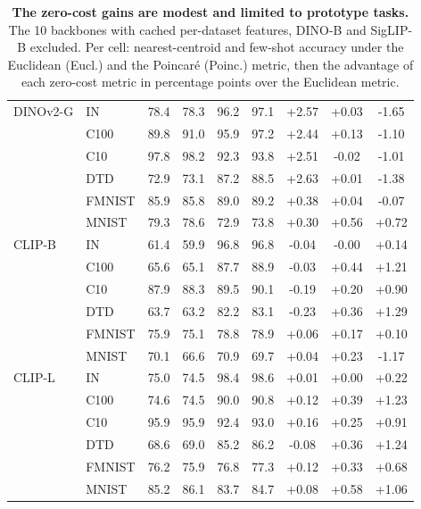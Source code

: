 \begin{table}[H]
\begin{tabular}{llccccccc}
\midrule
DINOv2-G & IN & 78.4 & 78.3 & 96.2 & 97.1 & +2.57 & +0.03 & -1.65 \\
 & C100 & 89.8 & 91.0 & 95.9 & 97.2 & +2.44 & +0.13 & -1.10 \\
 & C10 & 97.8 & 98.2 & 92.3 & 93.8 & +2.51 & -0.02 & -1.01 \\
 & DTD & 72.9 & 73.1 & 87.2 & 88.5 & +2.63 & +0.01 & -1.38 \\
 & FMNIST & 85.9 & 85.8 & 89.0 & 89.2 & +0.38 & +0.04 & -0.07 \\
 & MNIST & 79.3 & 78.6 & 72.9 & 73.8 & +0.30 & +0.56 & +0.72 \\
\midrule
CLIP-B & IN & 61.4 & 59.9 & 96.8 & 96.8 & -0.04 & -0.00 & +0.14 \\
 & C100 & 65.6 & 65.1 & 87.7 & 88.9 & -0.03 & +0.44 & +1.21 \\
 & C10 & 87.9 & 88.3 & 89.5 & 90.1 & -0.19 & +0.20 & +0.90 \\
 & DTD & 63.7 & 63.2 & 82.2 & 83.1 & -0.23 & +0.36 & +1.29 \\
 & FMNIST & 75.9 & 75.1 & 78.8 & 78.9 & +0.06 & +0.17 & +0.10 \\
 & MNIST & 70.1 & 66.6 & 70.9 & 69.7 & +0.04 & +0.23 & -1.17 \\
\midrule
CLIP-L & IN & 75.0 & 74.5 & 98.4 & 98.6 & +0.01 & +0.00 & +0.22 \\
 & C100 & 74.6 & 74.5 & 90.0 & 90.8 & +0.12 & +0.39 & +1.23 \\
 & C10 & 95.9 & 95.9 & 92.4 & 93.0 & +0.16 & +0.25 & +0.91 \\
 & DTD & 68.6 & 69.0 & 85.2 & 86.2 & -0.08 & +0.36 & +1.24 \\
 & FMNIST & 76.2 & 75.9 & 76.8 & 77.3 & +0.12 & +0.33 & +0.68 \\
 & MNIST & 85.2 & 86.1 & 83.7 & 84.7 & +0.08 & +0.58 & +1.06 \\
\bottomrule
\end{tabular}
\par\vspace{2pt}
\endgroup
\caption{\textbf{The zero-cost gains are modest and limited to prototype tasks.} The 10 backbones with cached per-dataset features, DINO-B and SigLIP-B excluded. Per cell: nearest-centroid and few-shot accuracy under the Euclidean (Eucl.) and the Poincar\'{e} (Poinc.) metric, then the advantage of each zero-cost metric in percentage points over the Euclidean metric.
}
\label{tab:q9-corollary}
\end{table}
